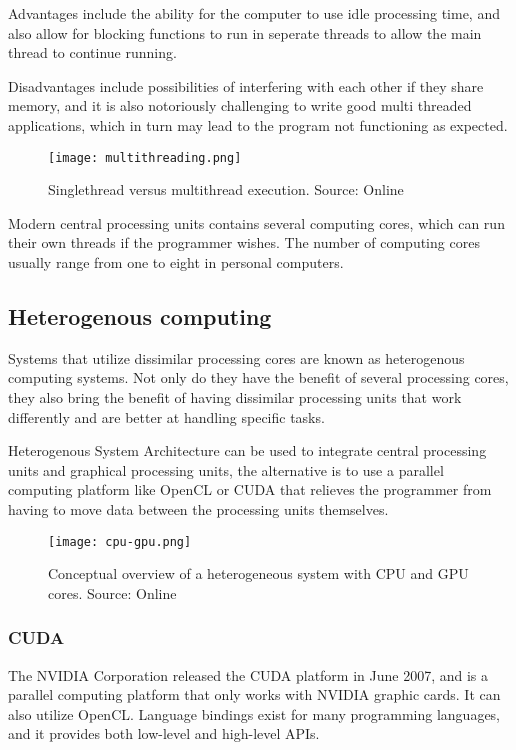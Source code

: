 Advantages include the ability for the computer to use idle processing time, and also allow for blocking functions to run in seperate threads to allow the main thread to continue running.

Disadvantages include possibilities of interfering with each other if they share memory, and it is also notoriously challenging to write good multi threaded applications, which in turn may lead to the program not functioning as expected.

\begin{figure}[ht]
    \centering
    \texttt{[image: multithreading.png]}
    \caption{Singlethread versus multithread execution. Source: Online \citet{multithreadingcpp15}}
    \label{fig:cfs_simple_new}
\end{figure}
\FloatBarrier

Modern central processing units contains several computing cores, which can run their own threads if the programmer wishes. The number of computing cores usually range from one to eight in personal computers.

\subsection{Heterogenous computing}
Systems that utilize dissimilar processing cores are known as heterogenous computing systems. Not only do they have the benefit of several processing cores, they also bring the benefit of having dissimilar processing units that work differently and are better at handling specific tasks.

Heterogenous System Architecture can be used to integrate central processing units and graphical processing units, the alternative is to use a parallel computing platform like OpenCL or CUDA that relieves the programmer from having to move data between the processing units themselves.

\begin{figure}[ht]
    \centering
    \texttt{[image: cpu-gpu.png]}
    \caption{Conceptual overview of a heterogeneous system with CPU and GPU cores. Source: Online \citet{cpugpu13}}
    \label{fig:cfs_simple_new}
\end{figure}
\FloatBarrier

\subsubsection{CUDA}
The NVIDIA Corporation released the CUDA platform in June 2007, and is a parallel computing platform that only works with NVIDIA graphic cards. It can also utilize OpenCL. Language bindings exist for many programming languages, and it provides both low-level and high-level APIs.

